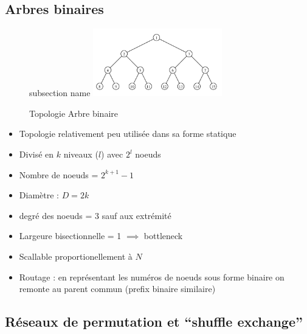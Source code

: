 \documentclass[12pt,a4paper,oneside, titlepage]{article}
\begin{document}
    \subsection*{Arbres binaires}

      \begin{figure}[H]subsection name
        \centering
        \includegraphics[width=0.5\textwidth]{images/tree}
        \caption{Topologie Arbre binaire}
      \end{figure}

      \begin{itemize}
        \item Topologie relativement peu utilisée dans sa forme statique
        \item Divisé en $k$ niveaux ($l$) avec $2^l$ noeuds
        \item Nombre de noeuds = $2^{k + 1}-1$
        \item Diamètre : $D = 2k$
        \item degré des noeuds = 3 sauf aux extrémité
        \item Largeure bisectionnelle = 1 $\implies$ bottleneck
        \item Scallable proportionellement à $N$
        \item Routage : en représentant les numéros de noeuds sous forme binaire on remonte au parent commun (prefix binaire similaire)
      \end{itemize}

    \subsection*{Réseaux de permutation et “shuffle exchange”}
\end{document}
